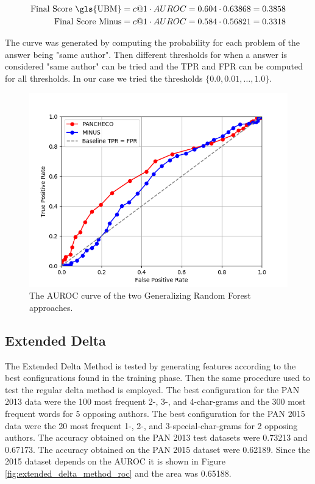\begin{align}
    \text{Final Score \gls{UBM}} &= c@1 \cdot AUROC = 0.604 \cdot 0.63868 = 0.3858  \\
    \text{Final Score Minus} &= c@1 \cdot AUROC = 0.584 \cdot 0.56821 = 0.3318
\end{align}

The curve was generated by computing the probability for each problem of the
answer being "same author". Then different thresholds for when a answer is
considered "same author" can be tried and the \gls{TPR} and \gls{FPR} can be
computed for all thresholds. In our case we tried the thresholds $\{0.0, 0.01,
\dots, 1.0\}$.

\begin{figure}
    \centering
    \includegraphics[width=.7\textwidth]{./pictures/forest_roc.png}
    \caption{The \gls{AUROC} curve of the two Generalizing Random Forest
    approaches.}
    \label{fig:forest_roc}
\end{figure}

\subsection{Extended Delta} \label{subsec:results:extended_delta}
The Extended Delta Method is tested by generating features according to the best
configurations found in the training phase. Then the same procedure used to test
the regular delta method is employed. The best configuration for the PAN 2013
data were the 100 most frequent 2-, 3-, and 4-char-grams and the 300 most
frequent words for 5 opposing authors. The best configuration for the PAN 2015
data were the 20 most frequent 1-, 2-, and 3-special-char-grams for 2 opposing
authors. The accuracy obtained on the PAN 2013 test datasets were 0.73213 and
0.67173. The accuracy obtained on the PAN 2015 dataset were 0.62189. Since the
2015 dataset depends on the \gls{AUROC} it is shown in Figure
\ref{fig:extended_delta_method_roc} and the area was 0.65188.

